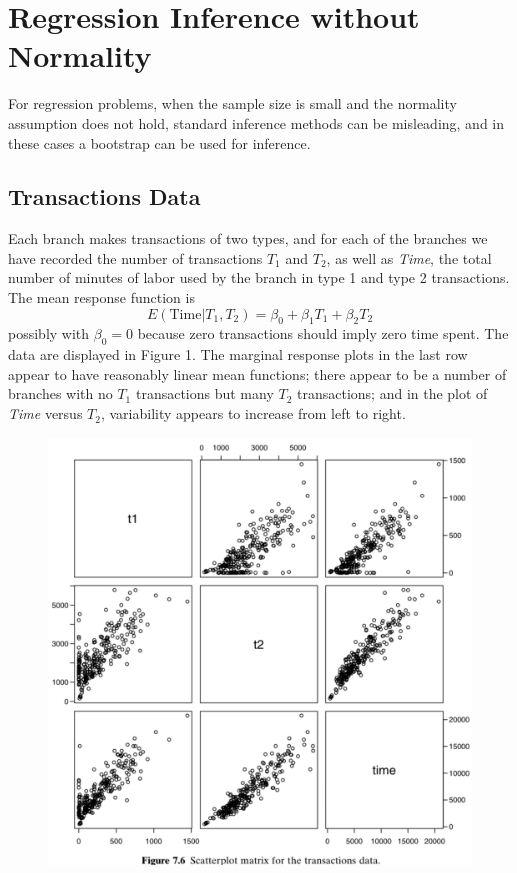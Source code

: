 \documentclass[14pt]{extarticle}
\begin{document}
\section*{Regression Inference without Normality}
\noindent
For regression problems, when the sample size is small and the normality assumption does not hold, standard inference methods can be misleading, and in these cases a bootstrap can be used for inference.
\subsection*{Transactions Data}
Each branch makes transactions of two types, and for each of the branches we have recorded the number of transactions \( T_1 \) and \( T_2 \), as well as \textit{Time}, the total number of minutes of labor used by the branch in type 1 and type 2 transactions. The mean response function is
\[
E(\text{Time} | T_1, T_2) = \beta_0 + \beta_1 T_1 + \beta_2 T_2
\]
possibly with \( \beta_0 = 0 \) because zero transactions should imply zero time spent. The data are displayed in Figure 1. The marginal response plots in the last row appear to have reasonably linear mean functions; there appear to be a number of branches with no \( T_1 \) transactions but many \( T_2 \) transactions; and in the plot of \textit{Time} versus \( T_2 \), variability appears to increase from left to right.\\
\begin{figure}[H]
    \centering
    \includegraphics[width=1\textwidth]{fig16.png}
\end{figure} 
\end{document}
